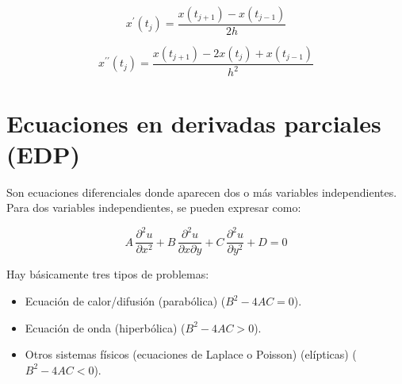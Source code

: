 \documentclass{article}
\begin{document}
\[
    x^\prime(t_j) = \frac{x(t_{j+1}) - x(t_{j-1})}{2h}
\]

\[
    x^{\prime\prime}(t_j) = \frac{x(t_{j+1}) - 2x(t_j) + x(t_{j-1})}{h^2}
\]

\section{Ecuaciones en derivadas parciales (EDP)}

Son ecuaciones diferenciales donde aparecen dos o más variables independientes.
Para dos variables independientes, se pueden expresar como:

\[
    A\,\frac{\partial^2u}{\partial x^2}
    + B\,\frac{\partial^2u}{\partial x\partial y}
    + C\,\frac{\partial^2u}{\partial y^2} + D = 0
\]

Hay básicamente tres tipos de problemas:

\begin{itemize}
    \item Ecuación de calor/difusión (parabólica) ($B^2-4AC=0$).
    \item Ecuación de onda (hiperbólica) ($B^2-4AC>0$).
    \item Otros sistemas físicos (ecuaciones de Laplace o Poisson) (elípticas)
    ($B^2-4AC<0$).
\end{itemize}
\end{document}
